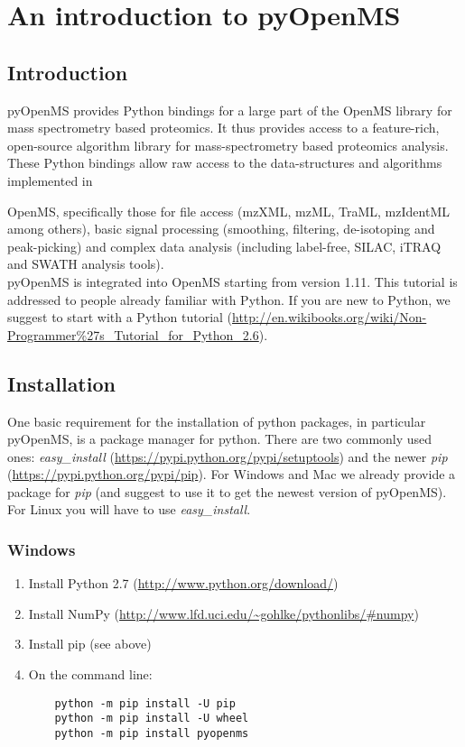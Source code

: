 
\newpage
\section{An introduction to pyOpenMS}

\subsection{Introduction}
pyOpenMS provides Python bindings for a large part of the OpenMS library for mass spectrometry based proteomics. It thus provides access to a feature-rich, open-source algorithm library for mass-spectrometry based proteomics analysis. These Python bindings allow raw access to the data-structures and algorithms implemented in {OpenMS, specifically those for file access (mzXML, mzML, TraML, mzIdentML among others), basic signal processing (smoothing, filtering, de-isotoping and peak-picking) and complex data analysis (including label-free, SILAC, iTRAQ and SWATH analysis tools).\\

pyOpenMS is integrated into OpenMS starting from version 1.11. This tutorial is addressed to people already familiar with Python. If you are new to Python, we suggest to start with a Python tutorial (\url{http://en.wikibooks.org/wiki/Non-Programmer%27s_Tutorial_for_Python_2.6}).

\subsection{Installation}
One basic requirement for the installation of python packages, in particular pyOpenMS, is a package manager for
python. There are two commonly used ones: \textit{easy\_install} (\url{https://pypi.python.org/pypi/setuptools}) and the newer \textit{pip} (\url{https://pypi.python.org/pypi/pip}). For Windows and Mac we
already provide a package for \textit{pip} (and suggest to use it to get the newest version of pyOpenMS). For Linux you will have to use \textit{easy\_install}.
\subsubsection{Windows}
\begin{enumerate}
  \item Install Python 2.7 (\url{http://www.python.org/download/})
  \item Install NumPy (\url{http://www.lfd.uci.edu/~gohlke/pythonlibs/#numpy})
  \item Install pip (see above)
  \item On the command line:
    \begin{lstlisting}
    python -m pip install -U pip
	python -m pip install -U wheel
	python -m pip install pyopenms
    \end{lstlisting}
\end{enumerate}

}
